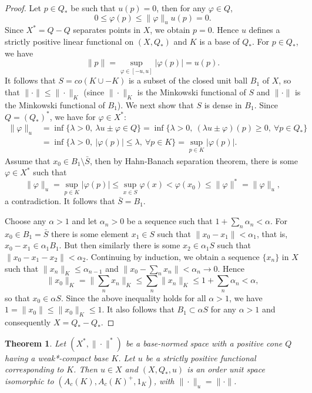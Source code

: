 \documentclass[12pt]{article}
\newtheorem{thm}{Theorem}
\theoremstyle{remark}
\newcommand{\<}{\langle}
\begin{document}
\begin{proof}
Let $p\in Q_*$ be such that $u(p)=0$, then for any $\varphi\in Q$, 
\[
0\le \varphi(p)\le \|\varphi\|_uu(p)=0.
\]
Since  $X^*=Q-Q$ separates points in $X$, we obtain $p=0$. Hence 
$u$ defines a strictly positive linear functional on $(X,Q_*)$  and $K$ is a base of $Q_*$. 
For $p\in Q_*$, we have
\[
\|p\|=\sup_{\varphi\in [-u,u]}|\varphi(p)|=u(p).
\]
It follows that $S=co(K\cup -K)$ is a subset of the closed unit ball $B_1$ of $X$, so that $\|\cdot\|\le \|\cdot\|_K$ (since $\|\cdot\|_K$ is the Minkowski functional of $S$ and 
$\|\cdot\|$ is the Minkowski functional of $B_1$).   We next show that $S$ is dense in $B_1$. Since $Q=(Q_*)^*$, we have for $\varphi\in X^*$:
\begin{align*}
\|\varphi\|_u&=\inf\{\lambda >0,\ \lambda u\pm \varphi\in Q\}=\inf\{\lambda >0,\ (\lambda u\pm \varphi)(p)\ge 0,\ \forall p \in Q_*\}\\
&= \inf\{\lambda>0,\ |\varphi(p)|\le \lambda,\ \forall p\in K\}=\sup_{p\in K}|\varphi(p)|.
\end{align*}
Assume that $x_0\in B_1\setminus \bar S$, then by Hahn-Banach separation theorem, there is some $\varphi\in X^*$ such that 
\[
\|\varphi\|_u=\sup_{p\in K}|\varphi(p)|\le \sup_{x\in S}\varphi(x)< \varphi(x_0)\le \|\varphi\|^*=\|\varphi\|_u,
\]
a contradiction. It follows that $\bar S=B_1$.  

Choose any $\alpha>1$ and let $\alpha_n>0$ be a sequence such that  $1+\sum_n\alpha_n<\alpha$. For $x_0\in B_1=\bar S$ there is some element $x_1\in S$ such that $\|x_0-x_1\|< \alpha_1$, that is, $x_0-x_1\in \alpha_1B_1$. But then similarly there is some $x_2\in \alpha_1S$ 
such that $\|x_0-x_1-x_2\|<\alpha_2$. Continuing by induction, we obtain a sequence $\{x_n\}$ in $X$ such that $\|x_n\|_K\le \alpha_{n-1}$ and  $\|x_0-\sum_n x_n\|<\alpha_n\to 0$. Hence  
\[
\|x_0\|_K=\|\sum_n x_n\|_K\le \sum_n\|x_n\|_K\le 1+\sum_n\alpha_n<\alpha,
\]
so that  $x_0\in \alpha S$. Since the above inequality holds for all $\alpha>1$, we have
$1=\|x_0\|\le \|x_0\|_K\le 1$. It also  follows that  $B_1\subset \alpha S$ for any $\alpha>1$ and consequently $X=Q_*-Q_*$. 





\end{proof}


\begin{thm} Let $(X^*,\|\cdot\|^*)$ be a base-normed space with a positive cone $Q$ having a weak*-compact base $K$. Let $u$ be a strictly positive functional corresponding to $K$.  
Then $u\in X$ and $(X,Q_*,u)$ is an order unit space isomorphic to $(A_c(K),A_c(K)^+,1_K)$, with  $\|\cdot\|_u=\|\cdot\|$.

\end{thm}
\end{document}
